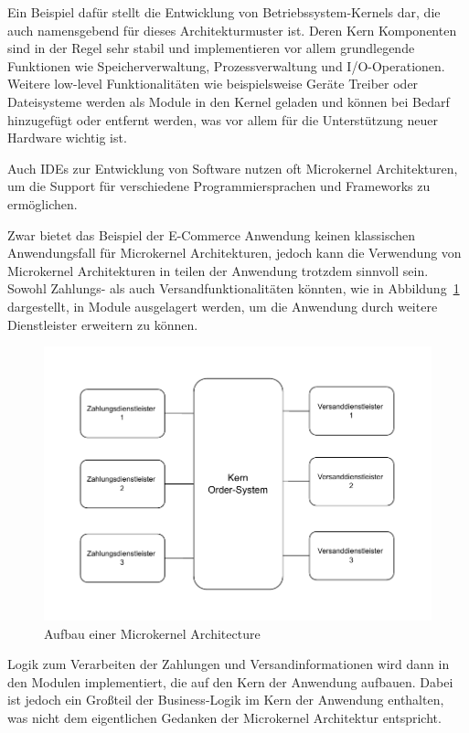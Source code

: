 \documentclass[acmtog]{acmart}
\begin{document}
Ein Beispiel dafür stellt die Entwicklung von Betriebssystem-Kernels dar, die auch namensgebend für dieses Architekturmuster ist.
Deren Kern Komponenten sind in der Regel sehr stabil und implementieren vor allem grundlegende Funktionen wie Speicherverwaltung, Prozessverwaltung und I/O-Operationen.
Weitere low-level Funktionalitäten wie beispielsweise Geräte Treiber oder Dateisysteme werden als Module in den Kernel geladen und können bei Bedarf hinzugefügt oder entfernt werden, was vor allem für die Unterstützung neuer Hardware wichtig ist.

Auch IDEs zur Entwicklung von Software nutzen oft Microkernel Architekturen, um die Support für verschiedene Programmiersprachen und Frameworks zu ermöglichen.

Zwar bietet das Beispiel der E-Commerce Anwendung keinen klassischen Anwendungsfall für Microkernel Architekturen, jedoch kann die Verwendung von Microkernel Architekturen in teilen der Anwendung trotzdem sinnvoll sein.
Sowohl Zahlungs- als auch Versandfunktionalitäten könnten, wie in Abbildung~\ref{fig:ecommerce-microkernel} dargestellt, in Module ausgelagert werden, um die Anwendung durch weitere Dienstleister erweitern zu können.

\begin{figure}[!h]
  \centering
  \includegraphics[width=\linewidth]{images/microkernel/ecommerce-mikrokernel}
  \caption{Aufbau einer Microkernel Architecture}
  \label{fig:ecommerce-microkernel}
\end{figure}

Logik zum Verarbeiten der Zahlungen und Versandinformationen wird dann in den Modulen implementiert, die auf den Kern der Anwendung aufbauen.
Dabei ist jedoch ein Großteil der Business-Logik im Kern der Anwendung enthalten, was nicht dem eigentlichen Gedanken der Microkernel Architektur entspricht.
\end{document}

